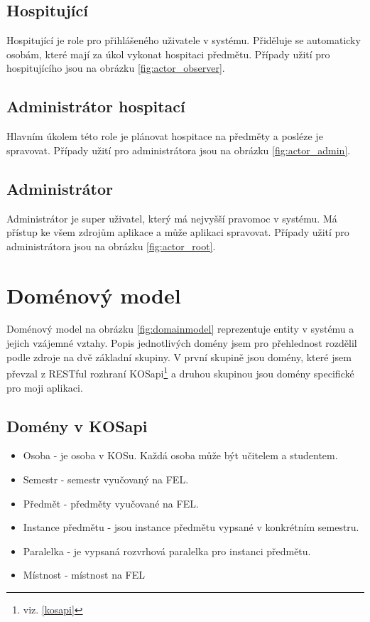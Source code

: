 \subsection{Hospitující}
Hospitující je role pro přihlášeného uživatele v systému. Přiděluje se automaticky osobám, které mají za úkol vykonat hospitaci předmětu. Případy užití pro hospitujícího jsou na obrázku \ref{fig:actor_observer}.

\subsection{Administrátor hospitací}
Hlavním úkolem této role je plánovat hospitace na předměty a posléze je spravovat. Případy užití pro administrátora jsou na obrázku \ref{fig:actor_admin}.

\subsection{Administrátor}
Administrátor je super uživatel, který má nejvyšší pravomoc v systému. Má přístup ke všem zdrojům aplikace a může aplikaci spravovat. Případy užití pro administrátora jsou na obrázku \ref{fig:actor_root}.

\newpage 
\section{Doménový model}
Doménový model na obrázku \ref{fig:domainmodel} reprezentuje entity v systému a jejich vzájemné vztahy. Popis jednotlivých domény jsem pro přehlednost rozdělil podle zdroje na dvě základní skupiny. V první skupině jsou domény, které jsem převzal z RESTful rozhraní KOSapi\footnote{viz. \ref{kosapi}} a druhou skupinou jsou domény specifické pro moji aplikaci. 

\label{sec:domeny_kosapi} 
\subsection{Domény v KOSapi}
\begin{itemize}
\item Osoba - je osoba v KOSu. Každá osoba může být učitelem a studentem.
\item Semestr - semestr vyučovaný na FEL. 
\item Předmět - předměty vyučované na FEL.
\item Instance předmětu - jsou instance předmětu vypsané v konkrétním semestru.
\item Paralelka - je vypsaná rozvrhová paralelka pro instanci předmětu.
\item Místnost - místnost na FEL
\end{itemize}

